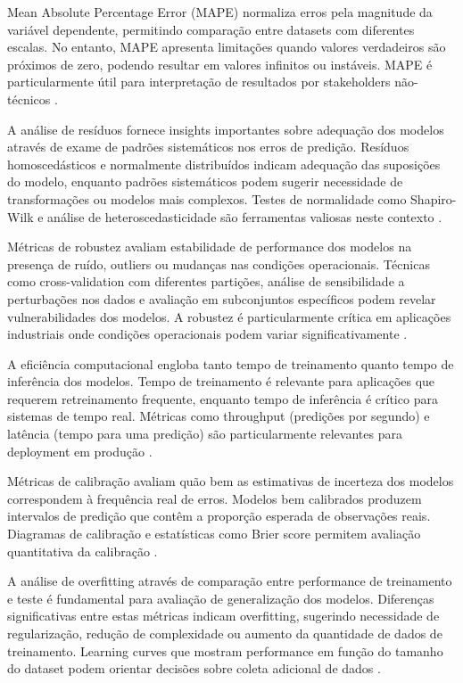 Mean Absolute Percentage Error (MAPE) normaliza erros pela magnitude da variável dependente, permitindo comparação entre datasets com diferentes escalas. No entanto, MAPE apresenta limitações quando valores verdadeiros são próximos de zero, podendo resultar em valores infinitos ou instáveis. MAPE é particularmente útil para interpretação de resultados por stakeholders não-técnicos \cite{kim2016new}.

A análise de resíduos fornece insights importantes sobre adequação dos modelos através de exame de padrões sistemáticos nos erros de predição. Resíduos homoscedásticos e normalmente distribuídos indicam adequação das suposições do modelo, enquanto padrões sistemáticos podem sugerir necessidade de transformações ou modelos mais complexos. Testes de normalidade como Shapiro-Wilk e análise de heteroscedasticidade são ferramentas valiosas neste contexto \cite{montgomery2012introduction}.

Métricas de robustez avaliam estabilidade de performance dos modelos na presença de ruído, outliers ou mudanças nas condições operacionais. Técnicas como cross-validation com diferentes partições, análise de sensibilidade a perturbações nos dados e avaliação em subconjuntos específicos podem revelar vulnerabilidades dos modelos. A robustez é particularmente crítica em aplicações industriais onde condições operacionais podem variar significativamente \cite{huber2009robust}.

A eficiência computacional engloba tanto tempo de treinamento quanto tempo de inferência dos modelos. Tempo de treinamento é relevante para aplicações que requerem retreinamento frequente, enquanto tempo de inferência é crítico para sistemas de tempo real. Métricas como throughput (predições por segundo) e latência (tempo para uma predição) são particularmente relevantes para deployment em produção \cite{li2020federated}.

Métricas de calibração avaliam quão bem as estimativas de incerteza dos modelos correspondem à frequência real de erros. Modelos bem calibrados produzem intervalos de predição que contêm a proporção esperada de observações reais. Diagramas de calibração e estatísticas como Brier score permitem avaliação quantitativa da calibração \cite{guo2017calibration}.

A análise de overfitting através de comparação entre performance de treinamento e teste é fundamental para avaliação de generalização dos modelos. Diferenças significativas entre estas métricas indicam overfitting, sugerindo necessidade de regularização, redução de complexidade ou aumento da quantidade de dados de treinamento. Learning curves que mostram performance em função do tamanho do dataset podem orientar decisões sobre coleta adicional de dados \cite{domingos2012few}.


